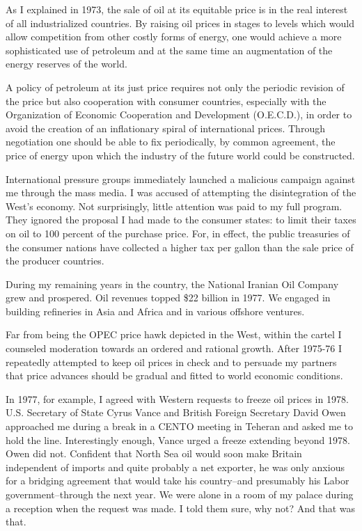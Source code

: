 As I explained in 1973, the sale of oil at its equitable price is in the real interest of all industrialized countries. By raising oil prices in stages to levels which would allow competition from other costly forms of energy, one would achieve a more sophisticated use of petroleum and at the same time an augmentation of the energy reserves of the world. 

A policy of petroleum at its just price requires not only the periodic revision of the price but also cooperation with consumer countries, especially with the Organization of Economic Cooperation and Development (O.E.C.D.), in order to avoid the creation of an inflationary spiral of international prices. Through negotiation one should be able to fix periodically, by common agreement, the price of energy upon which the industry of the future world could be constructed. 

International pressure groups immediately launched a malicious campaign against me through the mass media. I was accused of attempting the disintegration of the West's economy. Not surprisingly, little attention was paid to my full program. They ignored the proposal I had made to the consumer states: to limit their taxes on oil to 100 percent of the purchase price. For, in effect, the public treasuries of the consumer nations have collected a higher tax per gallon than the sale price of the producer countries. 

During my remaining years in the country, the National Iranian Oil Company grew and prospered. Oil revenues topped \$22 billion in 1977. We engaged in building refineries in Asia and Africa and in various offshore ventures. 

Far from being the OPEC price hawk depicted in the West, within the cartel I counseled moderation towards an ordered and rational growth. After 1975-76 I repeatedly attempted to keep oil prices in check and to persuade my partners that price advances should be gradual and fitted to world economic conditions. 

In 1977, for example, I agreed with Western requests to freeze oil prices in 1978. U.S. Secretary of State Cyrus Vance and British Foreign Secretary David Owen approached me during a break in a CENTO meeting in Teheran and asked me to hold the line. Interestingly enough, Vance urged a freeze extending beyond 1978. Owen did not. Confident that North Sea oil would soon make Britain independent of imports and quite probably a net exporter, he was only anxious for a bridging agreement that would take his country--and presumably his Labor government--through the next year. We were alone in a room of my palace during a reception when the request was made. I told them sure, why not? And that was that. 

